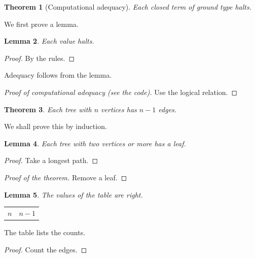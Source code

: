 \documentclass{amsart}
\newtheorem{thm}{Theorem}
\newtheorem{lem}[thm]{Lemma}
\begin{document}
\begin{thm}[Computational adequacy] Each closed term of ground type halts. \end{thm}

We first prove a lemma.

\begin{lem} Each value halts. \end{lem}
\begin{proof} By the rules. \end{proof}

Adequacy follows from the lemma.
\begin{proof}[Proof of computational adequacy \textnormal{(see the code)}]
Use the logical relation. \end{proof}

\begin{thm} Each tree with $n$ vertices has $n-1$ edges. \end{thm}

We shall prove this by induction.

\begin{lem} Each tree with two vertices or more has a leaf. \end{lem}
\begin{proof} Take a longest path. \end{proof}

\begin{proof}[Proof of the theorem] Remove a leaf. \end{proof}

\begin{lem} The values of the table are right. \end{lem}

\begin{longtable}{ll}
$n$ & $n-1$ \\
\end{longtable}

The table lists the counts.

\begin{proof} Count the edges. \end{proof}
\end{document}

